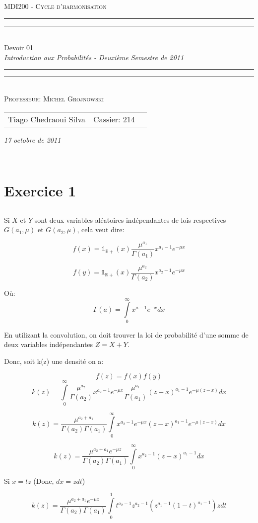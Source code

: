 \documentclass[a4paper]{article}
\date{Octobre 17, 2011}
\newcommand*{\titleTMB}{\begingroup \centering \settowidth{\unitlength}{\LARGE EE531} {\large\scshape MDI200 - Cycle d'harmonisation }\\[0.2\baselineskip] \rule{11.0cm}{1.6pt}\vspace*{-\baselineskip}\vspace*{2pt} \rule{11.0cm}{0.4pt}\\[\baselineskip] {\LARGE Devoir 01}\\\vspace*{\baselineskip}  {\itshape Introduction aux Probabilités - Deuxième Semestre de 2011}\\ \rule{11.0cm}{0.4pt}\vspace*{-\baselineskip}\vspace{3.2pt} \rule{11.0cm}{1.6pt}\\[\baselineskip] {\large\scshape Professeur: Michel Grojnowski}\par \vfill {\normalsize   \scshape 
    \begin{center} 
      \begin{tabular}{  l  l  p{5cm} } 
        Tiago Chedraoui Silva  & Cassier: 214\\
      \end{tabular} \end{center}
    \itshape 17 octobre de 2011    }\\[\baselineskip] \vspace{3.2pt} \endgroup}
\begin{document}
\titleTMB 
\newpage

\section{Exercice 1}

\subsection{}
Si $X$ et $Y$ sont deux variables aléatoires indépendantes de lois respectives $G(a_1,\mu)$ et $G(a_2,\mu)$, cela veut dire:

\begin{equation}
f(x)=\mathds{1}_{\mathbb{R}+}(x)\frac{\mu^{a_1}}{\Gamma (a_1)}x^{a_1-1}e^{-\mu x}
\end{equation}

\begin{equation}
f(y)=\mathds{1}_{\mathbb{R}+}(x)\frac{\mu^{a_2}}{\Gamma (a_2)}x^{a_2-1}e^{-\mu x}
\end{equation}

Où:
\begin{equation}
\Gamma \left( a \right) = \int\limits_0^\infty {x^{a - 1} } e^{ - x} dx  
\end{equation}

En utilizant la convolution, on doit trouver la loi de probabilité d'une somme de deux variables indépendantes $Z = X + Y$. 

Donc, soit k(z) une densité on a:

\begin{equation}
f(z)=f(x)f(y)
\end{equation}
\begin{equation}
k(z)= \int\limits_0^\infty\frac{\mu^{a_2}}{\Gamma (a_2)}x^{a_2-1}e^{-\mu x} \frac{\mu^{a_1}}{\Gamma (a_1)}(z-x)^{a_1-1}e^{-\mu (z-x)}dx
\end{equation}

\begin{equation}
k(z)=\frac{\mu^{a_2+a_1}}{\Gamma (a_2)\Gamma (a_1)}\int\limits_0^\infty{x^{a_2-1}e^{-\mu x} }(z-x)^{a_1-1}e^{-\mu (z-x)}dx
\end{equation}


\begin{equation}
k(z)=\frac{\mu^{a_2+a_1}e^{-\mu z}}{\Gamma (a_2)\Gamma (a_1)}\int\limits_0^\infty{x^{a_2-1}}(z-x)^{a_1-1}dx
\end{equation}

Si $x = tz$ (Donc, $dx = zdt$)

\begin{equation}
k(z)=\frac{\mu^{a_2+a_1}e^{-\mu z}}{\Gamma (a_2)\Gamma (a_1)}\int\limits_0^1{t^{a_2-1}z^{a_2-1}}(z^{a_1-1}(1-t)^{a_1-1})zdt
\end{equation}
\end{document}
